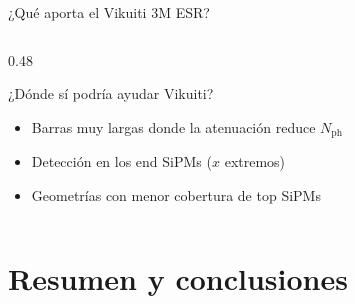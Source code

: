 \documentclass[aspectratio=169,10pt]{beamer}
\begin{document}
\begin{frame}{¿Qué aporta el Vikuiti 3M ESR?}
\begin{columns}[T]
\begin{column}{0.48\textwidth}
  \begin{block}{¿Dónde sí podría ayudar Vikuiti?}
  \footnotesize
  \begin{itemize}
    \item Barras muy largas donde la atenuación reduce $N_\text{ph}$
    \item Detección en los end SiPMs ($x$ extremos)
    \item Geometrías con menor cobertura de top SiPMs
  \end{itemize}
  \end{block}
  \end{column}
\end{columns}
\end{frame}

\section{Resumen y conclusiones}
\end{document}
